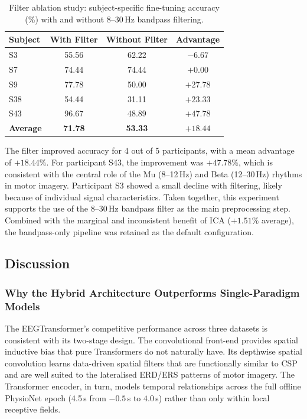 \documentclass[12pt, a4paper]{article}
\begin{document}
\begin{table}[htbp]
\centering
\caption{Filter ablation study: subject-specific fine-tuning accuracy (\%) with and without 8--30\,Hz bandpass filtering.}
\label{tab:filter_ablation}
\begin{tabular}{lccc}
\toprule
Subject & With Filter & Without Filter & Advantage \\
\midrule
S3  & 55.56 & 62.22 & $-6.67$ \\
S7  & 74.44 & 74.44 & $+0.00$ \\
S9  & 77.78 & 50.00 & $+27.78$ \\
S38 & 54.44 & 31.11 & $+23.33$ \\
S43 & 96.67 & 48.89 & $+47.78$ \\
\midrule
\textbf{Average} & \textbf{71.78} & \textbf{53.33} & $\mathbf{+18.44}$ \\
\bottomrule
\end{tabular}
\end{table}

The filter improved accuracy for 4 out of 5 participants, with a mean advantage of $+18.44\%$. For participant S43, the improvement was $+47.78\%$, which is consistent with the central role of the Mu (8--12\,Hz) and Beta (12--30\,Hz) rhythms in motor imagery. Participant S3 showed a small decline with filtering, likely because of individual signal characteristics. Taken together, this experiment supports the use of the 8--30\,Hz bandpass filter as the main preprocessing step. Combined with the marginal and inconsistent benefit of ICA ($+1.51\%$ average), the bandpass-only pipeline was retained as the default configuration.

\subsection{Discussion}

\subsubsection{Why the Hybrid Architecture Outperforms Single-Paradigm Models}
\label{sec:disc_hybrid}

The EEGTransformer's competitive performance across three datasets is consistent with its two-stage design. The convolutional front-end provides spatial inductive bias that pure Transformers do not naturally have. Its depthwise spatial convolution learns data-driven spatial filters that are functionally similar to CSP and are well suited to the lateralised ERD/ERS patterns of motor imagery. The Transformer encoder, in turn, models temporal relationships across the full offline PhysioNet epoch (4.5\,s from $-0.5$\,s to $4.0$\,s) rather than only within local receptive fields.
\end{document}
